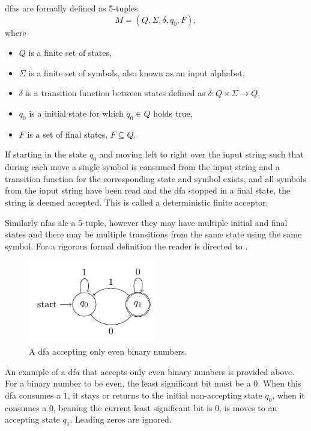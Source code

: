 \begin{definition}
\label{def:dfa}
\glspl{dfa} are formally defined as 5-tuples
$$ M = (Q, \Sigma, \delta, q_0, F),$$ 
where
\begin{itemize}
\item $Q$ is a finite set of states,
\item $\Sigma$ is a finite set of symbols, also known as an input alphabet,
\item $\delta$ is a transition function between states defined as $\delta : Q \times \Sigma \rightarrow Q$,
\item $q_0$ is a initial state for which $q_0 \in Q$ holds true,
\item $F$ is a set of final states, $F \subseteq Q$.
\end{itemize}


If starting in the state $q_0$ and moving left to right over the input string such that during each move a single symbol is consumed from the input string and a transition function for the corresponding state and symbol exists, and all symbols from the input string have been read and the \gls{dfa} stopped in a final state, the string is deemed accepted. This is called a deterministic finite acceptor.
\end{definition}

Similarly \glspl{nfa} ale a 5-tuple, however they may have multiple initial and final states and there may be multiple transitions from the same state using the same symbol. For a rigorous formal definition the reader is directed to \cite[Chapter~1.4]{Salomaa1987Formal}.

\begin{figure}[H]
  \label{fig:dfa}
  \centering
  \includegraphics[width=0.5\textwidth]{figures/dfa.pdf}
  \caption{A \gls{dfa} accepting only even binary numbers.}
\end{figure}

An example of a \gls{dfa} that accepts only even binary numbers is provided above. For a binary number to be even, the least significant bit must be a $0$. When this \gls{dfa} consumes a $1$, it stays or returns to the initial non-accepting state $q_0$, when it consumes a $0$, beaning the current least significant bit is $0$, is moves to an accepting state $q_1$. Leading zeros are ignored.





